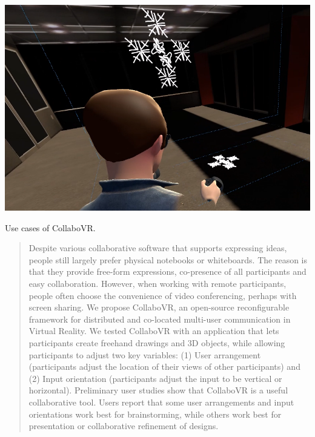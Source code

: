 \documentclass{sigchi}
\begin{document}
{    \includegraphics[width=0.2\paperwidth]{Figure1-4.png}
\caption{Use cases of CollaboVR.}
\label{fig:teaser}
} %
 
\maketitle

\begin{abstract}
  Despite various collaborative software that supports expressing ideas, people still largely prefer physical notebooks or whiteboards. The reason is that they provide free-form expressions, co-presence of all participants and easy collaboration. However, when working with remote participants, people often choose the convenience of video conferencing, perhaps with screen sharing. We propose CollaboVR, an open-source reconfigurable framework for distributed and co-located multi-user communication in Virtual Reality. We tested CollaboVR with an application that lets participants create freehand drawings and 3D objects, while allowing participants to adjust two key variables: (1) User arrangement (participants adjust the location of their views of other participants) and (2) Input orientation (participants adjust the input to be vertical or horizontal). Preliminary user studies show that CollaboVR is a useful collaborative tool. Users report that some user arrangements and input orientations work best for brainstorming, while others work best for presentation or collaborative refinement of designs.
\end{abstract}


\end{document}
